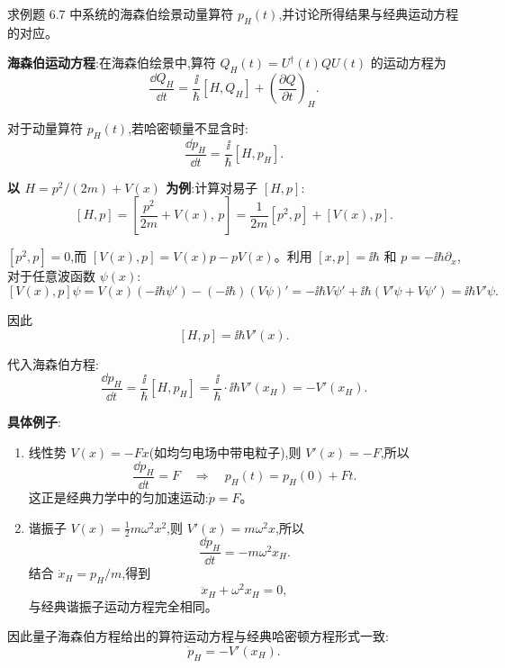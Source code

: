 \begin{question}
求例题 6.7 中系统的海森伯绘景动量算符 $p_H(t)$,并讨论所得结果与经典运动方程的对应。
\end{question}
\begin{solution}
	\textbf{海森伯运动方程}:在海森伯绘景中,算符 $Q_H(t)=U^\dagger(t)Q U(t)$ 的运动方程为
	\[
	\frac{\dd Q_H}{\dd t} = \frac{\ii}{\hbar}[H,Q_H] + \left(\frac{\partial Q}{\partial t}\right)_H.
	\]

	对于动量算符 $p_H(t)$,若哈密顿量不显含时:
	\[
	\frac{\dd p_H}{\dd t} = \frac{\ii}{\hbar}[H,p_H].
	\]

	\textbf{以 $H=p^2/(2m)+V(x)$ 为例}:计算对易子 $[H,p]$:
	\[
	[H,p] = \left[\frac{p^2}{2m}+V(x),\,p\right]
	= \frac{1}{2m}[p^2,p] + [V(x),p].
	\]

	$[p^2,p]=0$,而 $[V(x),p] = V(x)p - pV(x)$。利用 $[x,p]=\ii\hbar$ 和 $p=-\ii\hbar\partial_x$,对于任意波函数 $\psi(x)$:
	\[
	[V(x),p]\psi = V(x)(-\ii\hbar\psi') - (-\ii\hbar)(V\psi)' = -\ii\hbar V\psi' + \ii\hbar(V'\psi+V\psi') = \ii\hbar V'\psi.
	\]

	因此
	\[
	[H,p] = \ii\hbar V'(x).
	\]

	代入海森伯方程:
	\[
	\frac{\dd p_H}{\dd t} = \frac{\ii}{\hbar}[H,p_H] = \frac{\ii}{\hbar}\cdot\ii\hbar V'(x_H) = -V'(x_H).
	\]

	\textbf{具体例子}:
	\begin{enumerate}
	\item 线性势 $V(x) = -Fx$(如均匀电场中带电粒子),则 $V'(x) = -F$,所以
	\[
	\frac{\dd p_H}{\dd t} = F \quad\Longrightarrow\quad p_H(t) = p_H(0) + Ft.
	\]
	这正是经典力学中的匀加速运动:$\dot p = F$。

	\item 谐振子 $V(x)=\frac12 m\omega^2 x^2$,则 $V'(x)=m\omega^2 x$,所以
	\[
	\frac{\dd p_H}{\dd t} = -m\omega^2 x_H.
	\]
	结合 $\dot x_H = p_H/m$,得到
	\[
	\ddot x_H + \omega^2 x_H = 0,
	\]
	与经典谐振子运动方程完全相同。
	\end{enumerate}

	因此量子海森伯方程给出的算符运动方程与经典哈密顿方程形式一致:
	\[
	\boxed{\dot p_H = -V'(x_H)}.
	\]
	\end{solution}

